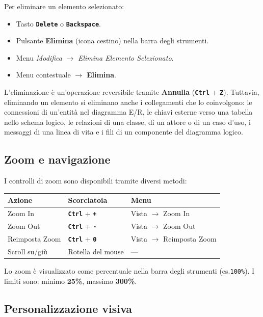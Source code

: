 \documentclass[a4paper,11pt]{article}
\newcommand{\key}[1]{\texttt{\textbf{#1}}}
\newcommand{\menu}[1]{\textit{#1}}
\newcommand{\uielement}[1]{\textbf{#1}}
\begin{document}
Per eliminare un elemento selezionato:
\begin{itemize}
  \item Tasto \key{Delete} o \key{Backspace}.
  \item Pulsante \uielement{Elimina} (icona cestino) nella barra degli strumenti.
  \item Menu \menu{Modifica} $\to$ \menu{Elimina Elemento Selezionato}.
  \item Menu contestuale $\to$ \uielement{Elimina}.
\end{itemize}

\begin{tcolorbox}[warnbox, title={Attenzione}]
  L'eliminazione è un'operazione reversibile tramite \textbf{Annulla} (\key{Ctrl} + \key{Z}).
  Tuttavia, eliminando un elemento si eliminano anche i collegamenti che lo coinvolgono: le
  connessioni di un'entità nel diagramma E/R, le chiavi esterne verso una tabella nello schema
  logico, le relazioni di una classe, di un attore o di un caso d'uso, i messaggi di una linea di
  vita e i fili di un componente del diagramma logico.
\end{tcolorbox}

\subsection{Zoom e navigazione}

I controlli di zoom sono disponibili tramite diversi metodi:

\begin{center}
\begin{tabular}{@{}lll@{}}
  \toprule
  \textbf{Azione} & \textbf{Scorciatoia} & \textbf{Menu} \\
  \midrule
  Zoom In         & \key{Ctrl} + \key{+} & Vista $\to$ Zoom In \\
  Zoom Out        & \key{Ctrl} + \key{-} & Vista $\to$ Zoom Out \\
  Reimposta Zoom  & \key{Ctrl} + \key{0} & Vista $\to$ Reimposta Zoom \\
  Scroll su/giù  & Rotella del mouse    & --- \\
  \bottomrule
\end{tabular}
\end{center}

Lo zoom è visualizzato come percentuale nella barra degli strumenti (es.\@ \texttt{100\%}).
I limiti sono: minimo \textbf{25\%}, massimo \textbf{300\%}.

\subsection{Personalizzazione visiva}
\end{document}

